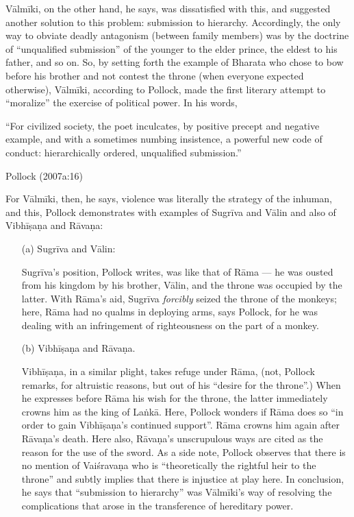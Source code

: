Vālmīki, on the other hand, he says, was dissatisfied with this, and suggested another solution to this problem: submission to hierarchy. Accordingly, the only way to obviate deadly antagonism (between family members) was by the doctrine of “unqualified submission” of the younger to the elder prince, the eldest to his father, and so on. So, by setting forth the example of Bharata who chose to bow before his brother and not contest the throne (when everyone expected otherwise), Vālmīki, according to Pollock, made the first literary attempt to “moralize” the exercise of political power. In his words,

\begin{myquote}
“For civilized society, the poet inculcates, by positive precept and negative example, and with a sometimes numbing insistence, a powerful new code of conduct: hierarchically ordered, unqualified submission.''

\hfill Pollock (2007a:16)
\end{myquote}

For Vālmīki, then, he says, violence was literally the strategy of the inhuman, and this, Pollock demonstrates with examples of Sugrīva and Vālin and also of Vibhīṣaṇa and Rāvaṇa: 
\begin{itemize}
\item[(a)] Sugrīva and Vālin:

Sugrīva’s position, Pollock writes, was like that of Rāma --- he was ousted from his kingdom by his brother, Vālin, and the throne was occupied by the latter. With Rāma’s aid, Sugrīva {\sl forcibly} seized the throne of the monkeys; here, Rāma had no qualms in deploying arms, says Pollock, for he was dealing with an infringement of righteousness on the part of a monkey. 

\item[(b)] Vibhīṣaṇa and Rāvaṇa. 

Vibhīṣaṇa, in a similar plight, takes refuge under Rāma, (not, Pollock remarks, for altruistic reasons, but out of his “desire for the throne”.) When he expresses before Rāma his wish for the throne, the latter immediately crowns him as the king of Laṅkā. Here, Pollock wonders if Rāma does so “in order to gain Vibhīṣaṇa’s continued support”. Rāma crowns him again after Rāvaṇa’s death. Here also, Rāvaṇa’s unscrupulous ways are cited as the reason for the use of the sword. As a side note, Pollock observes that there is no mention of Vaiśravaṇa who is “theoretically the rightful heir to the throne” and subtly implies that there is injustice at play here. In conclusion, he says that “submission to hierarchy” was Vālmīki’s way of resolving the complications that arose in the transference of hereditary power. 
\end{itemize}

